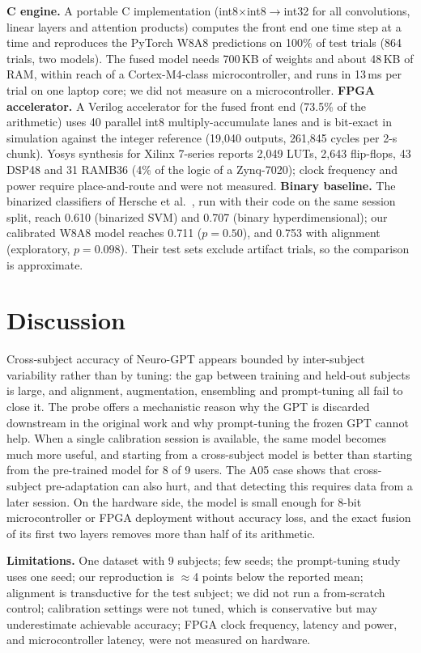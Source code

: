 \documentclass[conference]{IEEEtran}
\begin{document}
\textbf{C engine.} A portable C implementation (int8$\times$int8$\rightarrow$int32 for all convolutions, linear layers and
attention products) computes the front end one time step at a time and reproduces the PyTorch W8A8 predictions on 100\%
of test trials (864 trials, two models). The fused model needs 700\,KB of weights and about 48\,KB of RAM, within reach
of a Cortex-M4-class microcontroller, and runs in 13\,ms per trial on one laptop core; we did not measure on a
microcontroller. \textbf{FPGA accelerator.} A Verilog accelerator for the fused front end (73.5\% of the arithmetic) uses
40 parallel int8 multiply-accumulate lanes and is bit-exact in simulation against the integer reference (19,040 outputs,
261,845 cycles per 2-s chunk). Yosys synthesis for Xilinx 7-series reports 2,049 LUTs, 2,643 flip-flops, 43 DSP48 and
31 RAMB36 (4\% of the logic of a Zynq-7020); clock frequency and power require place-and-route and were not measured.
\textbf{Binary baseline.} The binarized classifiers of Hersche et al.~\cite{hersche2020binary}, run with their code on the
same session split, reach 0.610 (binarized SVM) and 0.707 (binary hyperdimensional); our calibrated W8A8 model reaches
0.711 ($p=0.50$), and 0.753 with alignment (exploratory, $p=0.098$). Their test sets exclude artifact trials, so the
comparison is approximate.

\section{Discussion}
Cross-subject accuracy of Neuro-GPT appears bounded by inter-subject variability rather than by tuning: the gap between
training and held-out subjects is large, and alignment, augmentation, ensembling and prompt-tuning all fail to close it.
The probe offers a mechanistic reason why the GPT is discarded downstream in the original work and why prompt-tuning
the frozen GPT cannot help. When a single calibration session is available, the same model becomes much more useful, and
starting from a cross-subject model is better than starting from the pre-trained model for 8 of 9 users. The A05 case
shows that cross-subject pre-adaptation can also hurt, and that detecting this requires data from a later session.
On the hardware side, the model is small enough for 8-bit microcontroller or FPGA deployment without accuracy loss,
and the exact fusion of its first two layers removes more than half of its arithmetic.

\textbf{Limitations.} One dataset with 9 subjects; few seeds; the prompt-tuning study uses one seed; our reproduction is
$\approx$4 points below the reported mean; alignment is transductive for the test subject; we did not run a from-scratch
control; calibration settings were not tuned, which is conservative but may underestimate achievable accuracy; FPGA clock
frequency, latency and power, and microcontroller latency, were not measured on hardware.
\end{document}
